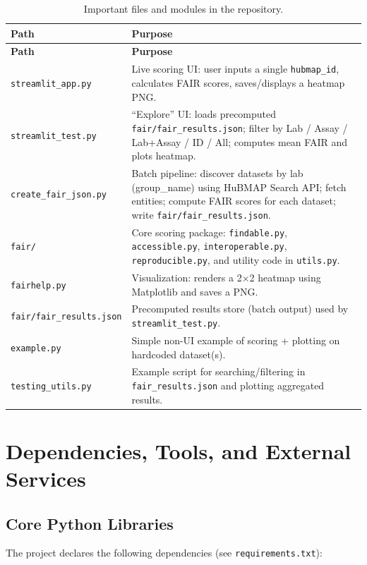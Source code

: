 \documentclass[11pt]{article}
\begin{document}
\begin{longtable}{@{}p{}p{}@{}}
\caption{Important files and modules in the repository.}\label{tab:structure}\\
\toprule
\textbf{Path} & \textbf{Purpose} \\
\midrule
\endfirsthead
\toprule
\textbf{Path} & \textbf{Purpose} \\
\midrule
\endhead
\bottomrule
\endfoot
\texttt{streamlit\_app.py} & Live scoring UI: user inputs a single \texttt{hubmap\_id}, calculates FAIR scores, saves/displays a heatmap PNG. \\
\texttt{streamlit\_test.py} & ``Explore'' UI: loads precomputed \texttt{fair/fair\_results.json}; filter by Lab / Assay / Lab+Assay / ID / All; computes mean FAIR and plots heatmap. \\
\texttt{create\_fair\_json.py} & Batch pipeline: discover datasets by lab (group\_name) using HuBMAP Search API; fetch entities; compute FAIR scores for each dataset; write \texttt{fair/fair\_results.json}. \\
\texttt{fair/} & Core scoring package: \texttt{findable.py}, \texttt{accessible.py}, \texttt{interoperable.py}, \texttt{reproducible.py}, and utility code in \texttt{utils.py}. \\
\texttt{fairhelp.py} & Visualization: renders a 2$\times$2 heatmap using Matplotlib and saves a PNG. \\
\texttt{fair/fair\_results.json} & Precomputed results store (batch output) used by \texttt{streamlit\_test.py}. \\
\texttt{example.py} & Simple non-UI example of scoring + plotting on hardcoded dataset(s). \\
\texttt{testing\_utils.py} & Example script for searching/filtering in \texttt{fair\_results.json} and plotting aggregated results. \\
\end{longtable}

\section{Dependencies, Tools, and External Services}
\subsection{Core Python Libraries}
The project declares the following dependencies (see \texttt{requirements.txt}):
\end{document}
